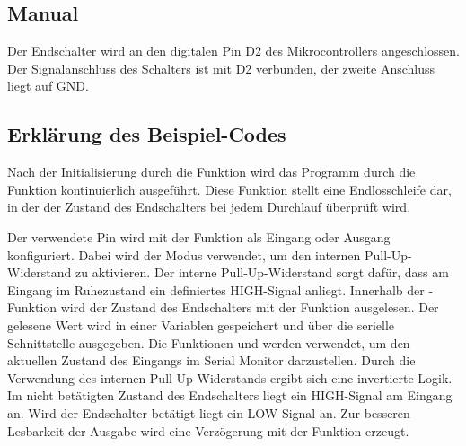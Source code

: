 \subsection{Manual}

Der Endschalter wird an den digitalen Pin D2 des Mikrocontrollers angeschlossen. 
Der Signalanschluss des Schalters ist mit D2 verbunden, der zweite Anschluss liegt auf GND. 



\subsection{Erklärung des Beispiel-Codes}

Nach der Initialisierung durch die Funktion  wird das Programm durch die Funktion  kontinuierlich ausgeführt. 
Diese Funktion stellt eine Endlosschleife dar, in der der Zustand des Endschalters bei jedem Durchlauf überprüft wird.\cite{arduino_setup, arduino_loop}

Der verwendete Pin wird mit der Funktion  als Eingang oder Ausgang konfiguriert. \cite{arduino_pinmode}
Dabei wird der Modus  verwendet, um den internen Pull-Up-Widerstand zu aktivieren.\cite{arduino_inputpullup}
Der interne Pull-Up-Widerstand sorgt dafür, dass am Eingang im Ruhezustand ein definiertes HIGH-Signal anliegt.
Innerhalb der -Funktion wird der Zustand des Endschalters mit der Funktion  ausgelesen. 
Der gelesene Wert wird in einer Variablen gespeichert und über die serielle Schnittstelle ausgegeben.\cite{arduino_digitalread}
Die Funktionen  und  werden verwendet, um den aktuellen Zustand des Eingangs im Serial Monitor darzustellen.\cite{arduino_serialprint}
Durch die Verwendung des internen Pull-Up-Widerstands ergibt sich eine invertierte Logik. 
Im nicht betätigten Zustand des Endschalters liegt ein HIGH-Signal am Eingang an. Wird der Endschalter betätigt liegt ein LOW-Signal an.
Zur besseren Lesbarkeit der Ausgabe wird eine Verzögerung mit der Funktion  erzeugt.\cite{arduino_delay}






{
	\label{lst:microswitch-basic}
}




